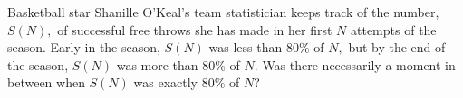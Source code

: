 Basketball star Shanille O'Keal's team statistician keeps track of the number, $S(N),$ of successful free throws she has made in her first $N$ attempts of the season. Early in the season, $S(N)$ was less than $80\%$ of $N,$ but by the end of the season, $S(N)$ was more than $80\%$ of $N.$ Was there necessarily a moment in between when $S(N)$ was exactly $80\%$ of $N$?
